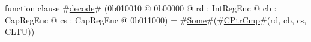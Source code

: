 function clause #\hyperref[zdecode]{decode}# (0b010010 @ 0b00000 @ rd : IntRegEnc @ cb : CapRegEnc @ cs : CapRegEnc @ 0b011000) = #\hyperref[zSome]{Some}#(#\hyperref[zCPtrCmp]{CPtrCmp}#(rd, cb, cs, CLTU))
